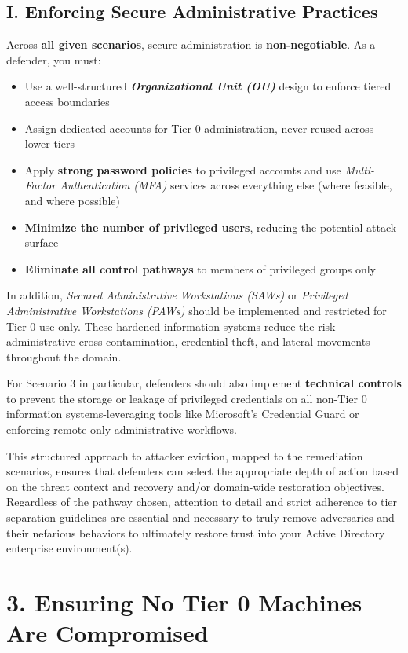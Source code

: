 \subsection{I. Enforcing Secure Administrative Practices}
Across \textbf{all given scenarios}, secure administration is \textbf{non-negotiable}. As a defender, you must:
\begin{itemize}
    \item Use a well-structured \textbf{\textit{Organizational Unit (OU)}} design to enforce tiered access boundaries
    \item Assign dedicated accounts for Tier 0 administration, never reused across lower tiers
    \item Apply \textbf{strong password policies} to privileged accounts and use \textit{Multi-Factor Authentication (MFA)} services across everything else (where feasible, and where possible)
    \item \textbf{Minimize the number of privileged users}, reducing the potential attack surface
    \item \textbf{Eliminate all control pathways} to members of privileged groups only
\end{itemize}

In addition, \textit{Secured Administrative Workstations (SAWs)} or \textit{Privileged Administrative Workstations (PAWs)} should be implemented and restricted for Tier 0 use only. These hardened information systems reduce the risk administrative cross-contamination, credential theft, and lateral movements throughout the domain.

For Scenario 3 in particular, defenders should also implement \textbf{technical controls} to prevent the storage or leakage of privileged credentials on all non-Tier 0 information systems-leveraging tools like Microsoft's Credential Guard or enforcing remote-only administrative workflows.

This structured approach to attacker eviction, mapped to the remediation scenarios, ensures that defenders can select the appropriate depth of action based on the threat context and recovery and/or domain-wide restoration objectives. Regardless of the pathway chosen, attention to detail and strict adherence to tier separation guidelines are essential and necessary to truly remove adversaries and their nefarious behaviors to ultimately restore trust into your Active Directory enterprise environment(s).

\section{3. Ensuring No Tier 0 Machines Are Compromised}

